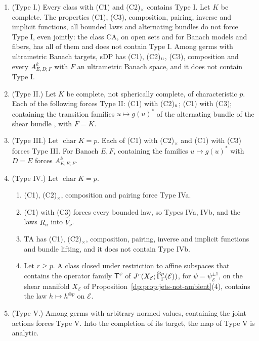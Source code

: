 \begin{theorem}[forcing]\label{dp:thm:forcing}
\leavevmode
\begin{enumerate}
\item \textup{(Type I.)} Every class with \textup{(C1)} and \textup{(C2)}$_\times$ contains Type I. Let $K$ be complete. The properties \textup{(C1)}, \textup{(C3)}, composition, pairing, inverse and implicit functions, all bounded laws and alternating bundles do not force Type I, even jointly: the class CA, on open sets and for Banach models and fibers, has all of them and does not contain Type I. Among germs with ultrametric Banach targets, sDP has \textup{(C1)}, \textup{(C2)}$_{\rm u}$, \textup{(C3)}, composition and every $A^k_{E,D;F}$ with $F$ an ultrametric Banach space, and it does not contain Type I.
\item \textup{(Type II.)} Let $K$ be complete, not spherically complete, of characteristic $p$. Each of the following forces Type II: \textup{(C1)} with \textup{(C2)}$_{\rm u}$; \textup{(C1)} with \textup{(C3)}; containing the transition families $u\mapsto g(u)^*$ of the alternating bundle of the shear bundle \cite[Proposition~10.1, Corollary~10.2]{I}, with $F=K$.
\item \textup{(Type III.)} Let $\operatorname{char}K=p$. Each of \textup{(C1)} with \textup{(C2)}$_\times$ and \textup{(C1)} with \textup{(C3)} forces Type III. For Banach $E,F$, containing the families $u\mapsto g(u)^*$ with $D=E$ forces $A^k_{E,E;F}$.
\item \textup{(Type IV.)} Let $\operatorname{char}K=p$.
\begin{enumerate}
\item \textup{(C1)}, \textup{(C2)}$_\times$, composition and pairing force Type IVa.
\item \textup{(C1)} with \textup{(C3)} forces every bounded law, so Types IVa, IVb, and the laws $R_n$ into $\widehat V_\nu$.
\item TA has \textup{(C1)}, \textup{(C2)}$_\times$, composition, pairing, inverse and implicit functions and bundle lifting, and it does not contain Type IVb.
\item Let $r\ge p$. A class closed under restriction to affine subspaces that contains the operator family $\mathsf T^\psi$ of $J^r(X_{\mathcal E};\widehat\Gamma^p_\Gamma(\mathcal E))$, for $\psi=\psi_{\mathcal E}^{\pm1}$, on the shear manifold $X_{\mathcal E}$ of Proposition~\ref{dp:prop:jets-not-ambient}(4), contains the law $h\mapsto h^{\otimes p}$ on $\mathcal E$.
\end{enumerate}
\item \textup{(Type V.)} Among germs with arbitrary normed values, containing the joint actions forces Type V. Into the completion of its target, the map of Type V is analytic.
\end{enumerate}
\end{theorem}

